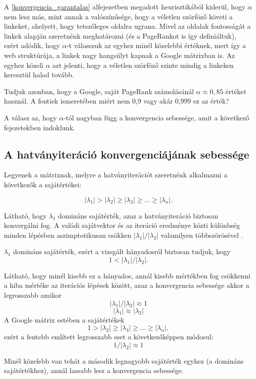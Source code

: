 \documentclass[12pt,a4paper]{article}
\begin{document}
A \ref{konvergencia_garantalas} alfejezetben megadott heurisztikából kiderül, hogy $\alpha$ nem lesz más, mint annak a valószínűsége, hogy a véletlen szörföző követi a linkeket, ahelyett, hogy tetszőleges oldalra ugrana. Mivel az oldalak fontosságát a linkek alapján szeretnénk meghatározni (és a PageRankot is így definiáltuk), ezért adódik, hogy $\alpha$-t válasszuk az egyhez minél közelebbi értéknek, mert így a web struktúrája, a linkek nagy hangsúlyt kapnak a Google mátrixban is. Az egyhez közeli $\alpha$ azt jelenti, hogy a véletlen szörföző szinte mindig a linkeken keresztül halad tovább.

Tudjuk azonban, hogy a Google, saját PageRank számolásánál $\alpha \approx 0,85$ \cite{lang2} értéket használ. A fentiek ismeretében miért nem 0,9 vagy akár 0,999 ez az érték? 

A válasz az, hogy $\alpha$-tól nagyban függ a konvergencia sebessége, amit a következő fejezetekben indoklunk.

\subsection{A hatványiteráció konvergenciájának sebessége}\label{konvergencia_sebesseg}

Legyenek a mátrixnak, melyre a hatványiterációt szeretnénk alkalmazni a következők a sajátértékei:

\[ |\lambda_1| > |\lambda_2| \geq |\lambda_3| \geq ... \geq |\lambda_n|. \] 

Látható, hogy $\lambda_1$ domináns sajátérték, azaz a hatványiteráció biztosan konvergálni fog. A valódi sajátvektor és az iteráció eredménye közti különbség minden lépésben aszimptotikusan csökken $ |\lambda_1| / |\lambda_2|$ valamilyen többszörösével \cite{poweriteration}.

$\lambda_1$ domináns sajátérték, ezért a vizsgált hányadosról biztosan tudjuk, hogy
\[ 1 < |\lambda_1| / |\lambda_2|. \]

Látható, hogy minél kisebb ez a hányados, annál kisebb mértékben fog csökkenni a hiba mértéke az iterációs lépések között, azaz a konvergencia sebessége akkor a legrosszabb amikor
\[ |\lambda_1| / |\lambda_2| \approx 1 \]
\[ |\lambda_1| \approx |\lambda_2| \]
A Google mátrix estében a sajátértékek
\[ 1 > |\lambda_2| \geq |\lambda_3| \geq ... \geq |\lambda_n|, \]
ezért a fentebb említett legrosszabb eset a következőképpen módosul:
\[ 1 / |\lambda_2| \approx 1 \]

Minél közelebb van tehát a második legnagyobb sajátérték egyhez (a domináns sajátértékhez), annál lassabb lesz a konvergencia sebessége.
\end{document}
